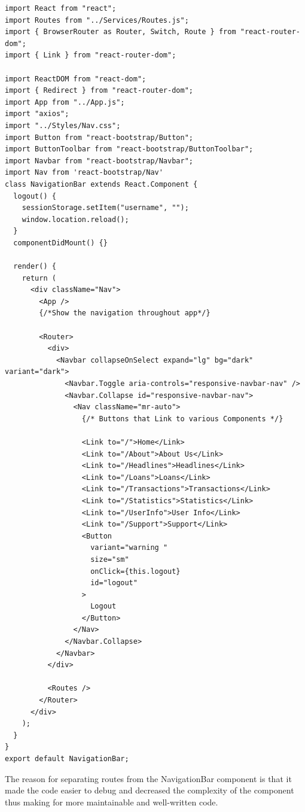 \begin{verbatim}
import React from "react";
import Routes from "../Services/Routes.js";
import { BrowserRouter as Router, Switch, Route } from "react-router-dom";
import { Link } from "react-router-dom";

import ReactDOM from "react-dom";
import { Redirect } from "react-router-dom";
import App from "../App.js";
import "axios";
import "../Styles/Nav.css";
import Button from "react-bootstrap/Button";
import ButtonToolbar from "react-bootstrap/ButtonToolbar";
import Navbar from "react-bootstrap/Navbar";
import Nav from 'react-bootstrap/Nav'
class NavigationBar extends React.Component {
  logout() {
    sessionStorage.setItem("username", "");
    window.location.reload();
  }
  componentDidMount() {}

  render() {
    return (
      <div className="Nav">
        <App />
        {/*Show the navigation throughout app*/}

        <Router>
          <div>
            <Navbar collapseOnSelect expand="lg" bg="dark" variant="dark">
              <Navbar.Toggle aria-controls="responsive-navbar-nav" />
              <Navbar.Collapse id="responsive-navbar-nav">
                <Nav className="mr-auto">
                  {/* Buttons that Link to various Components */}

                  <Link to="/">Home</Link>
                  <Link to="/About">About Us</Link>
                  <Link to="/Headlines">Headlines</Link>
                  <Link to="/Loans">Loans</Link>
                  <Link to="/Transactions">Transactions</Link>
                  <Link to="/Statistics">Statistics</Link>
                  <Link to="/UserInfo">User Info</Link>
                  <Link to="/Support">Support</Link>
                  <Button
                    variant="warning "
                    size="sm"
                    onClick={this.logout}
                    id="logout"
                  >
                    Logout
                  </Button>
                </Nav>
              </Navbar.Collapse>
            </Navbar>
          </div>

          <Routes />
        </Router>
      </div>
    );
  }
}
export default NavigationBar;
\end{verbatim}
The reason for separating routes from the NavigationBar component is that it made the code easier
to debug and decreased the complexity of the component thus making for more maintainable
and well-written code.
